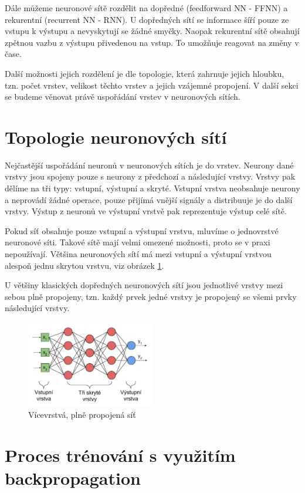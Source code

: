 Dále můžeme neuronové sítě rozdělit na dopředné (feedforward NN - FFNN) a
rekurentní (recurrent NN - RNN). U dopředných sítí se informace šíří pouze ze
vstupu k výstupu a nevyskytují se žádné smyčky. Naopak rekurentní sítě obsahují
zpětnou vazbu z výstupu přivedenou na vstup. To umožňuje reagovat na změny v
čase.

Další možnosti jejich rozdělení je dle topologie, která zahrnuje jejich
hloubku, tzn. počet vrstev, velikost těchto vrstev a jejich vzájemné propojení.
V další sekci se budeme věnovat právě uspořádání vrstev v neuronových sítích.

\section{Topologie neuronových sítí}
Nejčastější uspořádání neuronů v neuronových sítích je do vrstev. Neurony dané
vrstvy jsou spojeny pouze s neurony z předchozí a následující vrstvy. Vrstvy
pak dělíme na tři typy: vstupní, výstupní a skryté. Vstupní vrstva neobsahuje
neurony a neprovádí žádné operace, pouze přijímá vnější signály a distribuuje
je do další vrstvy. Výstup z neuronů ve výstupní vrstvě pak reprezentuje výstup
celé sítě.

Pokud síť obsahuje pouze vstupní a výstupní vrstvu, mluvíme o jednovrstvé
neuronové síti. Takové sítě mají velmi omezené možnosti, proto se v praxi
nepoužívají. Většina neuronových sítí má mezi vstupní a výstupní vrstvou
alespoň jednu skrytou vrstvu, viz obrázek \ref{fig:layers}.

U většiny klasických dopředných neuronových sítí jsou jednotlivé vrstvy mezi
sebou plně propojeny, tzn. každý prvek jedné vrstvy je propojený se všemi prvky
následující vrstvy.

\begin{figure}[]
    \centering
    \includegraphics[width=0.5\textwidth]{Figures/layers.png}
    \caption{Vícevrstvá, plně propojená síť \cite{lagan}}
    \label{fig:layers}
\end{figure}

\section{Proces trénování s využitím backpropagation}

